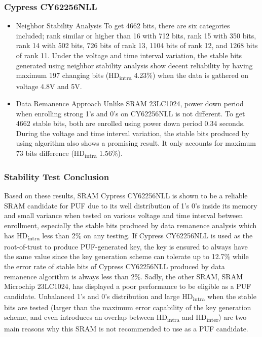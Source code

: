\subsubsection{Cypress CY62256NLL}
\begin{itemize}
  \item Neighbor Stability Analysis\newline
  To get 4662 bits, there are six categories included; rank similar or higher than 16 with 712 bits, rank 15 with 350 bits, rank 14 with 502 bits, 726 bits of rank 13, 1104 bits of rank 12, and 1268 bits of rank 11.
  Under the voltage and time interval variation, the stable bits generated using neighbor stability analysis show decent reliability by having maximum 197 changing bits (HD\textsubscript{intra} 4.23\%) when the data is gathered on voltage 4.8V and 5V.

  \item Data Remanence Approach\newline
  Unlike SRAM 23LC1024, power down period when enrolling strong 1's and 0's on CY62256NLL is not different. To get 4662 stable bits, both are enrolled using power down period 0.34 seconds.
  During the voltage and time interval variation, the stable bits produced by using algorithm also shows a promising result. It only accounts for maximum 73 bits difference (HD\textsubscript{intra} 1.56\%).
\end{itemize}


\subsubsection{Stability Test Conclusion}

Based on these results, SRAM Cypress CY62256NLL is shown to be a reliable SRAM candidate for PUF due to its well distribution of 1's 0's inside its memory and small variance when tested on various voltage and time interval between enrollment, especially the stable bits produced by data remanence analysis which has HD\textsubscript{intra} less than 2\% on any testing. If Cypress CY62256NLL is used as the root-of-trust to produce PUF-generated key, the key is ensured to always have the same value since the key generation scheme can tolerate up to 12.7\% while the error rate of stable bits of Cypress CY62256NLL produced by data remanence algorithm is always less than 2\%.
Sadly, the other SRAM, SRAM Microchip 23LC1024, has displayed a poor performance to be eligible as a PUF candidate. Unbalanced 1's and 0's distribution and large HD\textsubscript{intra} when the stable bits are tested (larger than the maximum error capability of the key generation scheme, and even introduces an overlap between HD\textsubscript{intra} and HD\textsubscript{inter}) are two main reasons why this SRAM is not recommended to use as a PUF candidate.

